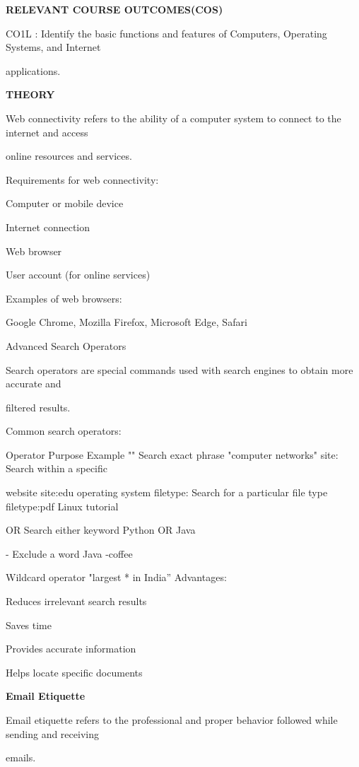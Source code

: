 \documentclass[10pt,a4paper]{article}
\begin{document}
\medskip\noindent\textbf{RELEVANT COURSE OUTCOMES(COS)}\par
\noindent CO1L : Identify the basic functions and features of Computers, Operating Systems, and Internet\par
\noindent applications.\par

\medskip\noindent\textbf{THEORY}\par
\noindent Web connectivity refers to the ability of a computer system to connect to the internet and access\par
\noindent online resources and services.\par

\noindent Requirements for web connectivity:\par
\noindent\textbullet\; Computer or mobile device\par
\noindent\textbullet\; Internet connection\par
\noindent\textbullet\; Web browser\par
\noindent\textbullet\; User account (for online services)\par

\noindent Examples of web browsers:\par
\noindent\textbullet\; Google Chrome, Mozilla Firefox, Microsoft Edge, Safari\par
\noindent Advanced Search Operators\par
\noindent Search operators are special commands used with search engines to obtain more accurate and\par
\noindent filtered results.\par

\noindent Common search operators:\par
\noindent Operator Purpose Example "" Search exact phrase "computer networks" site: Search within a specific\par
\noindent website site:edu operating system filetype: Search for a particular file type filetype:pdf Linux tutorial\par
\noindent OR Search either keyword Python OR Java\par
\noindent - Exclude a word Java -coffee\par
\noindent\textbullet\; Wildcard operator "largest * in India” Advantages:\par
\noindent\textbullet\; Reduces irrelevant search results\par
\noindent\textbullet\; Saves time\par
\noindent\textbullet\; Provides accurate information\par
\noindent\textbullet\; Helps locate specific documents\par
\medskip\noindent\textbf{Email Etiquette}\par
\noindent Email etiquette refers to the professional and proper behavior followed while sending and receiving\par
\noindent emails.\par
\end{document}
